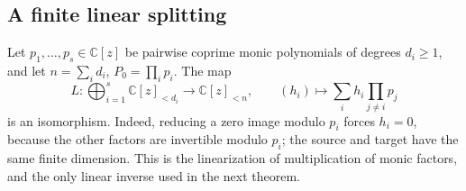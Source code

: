 \documentclass[11pt,letterpaper]{article}
\numberwithin{equation}{section}
\theoremstyle{definition}
\theoremstyle{remark}\newtheorem{remark}[theorem]{Remark}
\newcommand{\C}{\mathbb C}
\begin{document}
\subsection{A finite linear splitting}
Let $p_1,\ldots,p_s\in\C[z]$ be pairwise coprime monic polynomials of
degrees $d_i\ge1$, and let $n=\sum_id_i$, $P_0=\prod_ip_i$.
The map
\begin{equation}\label{eq:factorlinear}
 L:\bigoplus_{i=1}^s\C[z]_{<d_i}\longrightarrow\C[z]_{<n},\qquad
 (h_i)\longmapsto\sum_i h_i\prod_{j\ne i}p_j
\end{equation}
is an isomorphism. Indeed, reducing a zero image modulo $p_i$ forces
$h_i=0$, because the other factors are invertible modulo $p_i$; the
source and target have the same finite dimension. This is the
linearization of multiplication of monic factors, and the only linear
inverse used in the next theorem.
\end{document}
